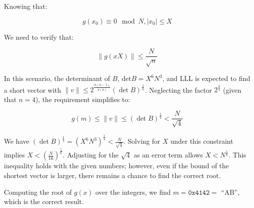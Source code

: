 \documentclass[a4paper,12pt]{report}
\begin{document}
% 
% 
% 
% 

Knowing that:

\[
    g(x_0) \equiv 0 \mod N, |x_0| \le X
\]

We need to verify that:

\[
    \lVert g(xX) \rVert \le \frac{N}{\sqrt{n}}
\] 

In this scenario, the determinant of $B$, $\text{det} B = X^6N^3$, and LLL is expected to find a short vector with $\lVert v \rVert \le 2^{\frac{n(n-1)}{4(n)}} (\det B)^{\frac{1}{n}}$.
Neglecting the factor $2^{\frac{3}{4}}$ (given that $n = 4$), the requirement simplifies to:

\[
    g(m) \le \lVert v \rVert \le (\det B)^{\frac{1}{4}} < \frac{N}{\sqrt{4}}
\] 

\vspace*{10px}

We have $(\det B)^{\frac{1}{4}} = (X^6N^3)^{\frac{1}{4}} < \frac{N}{\sqrt{4}}$. Solving for $X$ under this constraint implies $X < (\frac{N}{16})^{\frac{1}{6}}$. Adjusting for the $\sqrt{4}$ as an error term allows $X < N^{\frac{1}{6}}$.
This inequality holds with the given numbers; however, even if the bound of the shortest vector is larger, there remains a chance to find the correct root.

Computing the root of $g(x)$ over the integers, we find $m = \texttt{0x4142} = $ ``AB'', which is the correct result.\\
\end{document}
